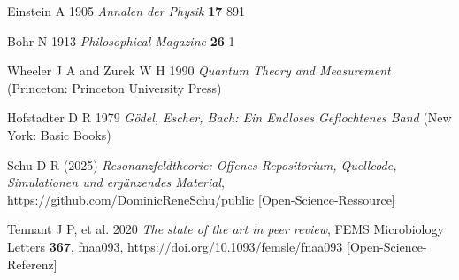 \documentclass[12pt]{article}
\begin{document}
\begin{thebibliography}{99}
	
	Einstein A 1905 \textit{Annalen der Physik} \textbf{17} 891
	
	Bohr N 1913 \textit{Philosophical Magazine} \textbf{26} 1
	
	Wheeler J A and Zurek W H 1990 \textit{Quantum Theory and Measurement} (Princeton: Princeton University Press)
	
	Hofstadter D R 1979 \textit{G\"odel, Escher, Bach: Ein Endloses Geflochtenes Band} (New York: Basic Books)
	
	Schu D-R (2025) \textit{Resonanzfeldtheorie: Offenes Repositorium, Quellcode, Simulationen und ergänzendes Material}, \url{https://github.com/DominicReneSchu/public} [Open-Science-Ressource]
	
	Tennant J P, et al. 2020 \textit{The state of the art in peer review}, FEMS Microbiology Letters \textbf{367}, fnaa093, \url{https://doi.org/10.1093/femsle/fnaa093} [Open-Science-Referenz]
	
\end{thebibliography}
\end{document}
